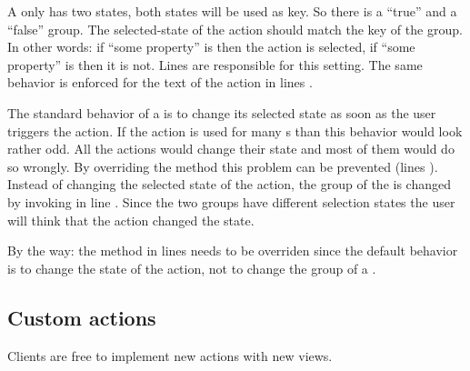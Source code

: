 A  only has two states, both states will be used as key. So there is a ``true'' and a ``false'' group. The selected-state of the action should match the key of the group. In other words: if ``some property'' is  then the action is selected, if ``some property'' is  then it is not. Lines  are responsible for this setting. The same behavior is enforced for the text of the action in lines .


The standard behavior of a  is to change its selected state as soon as the user triggers the action. If the action is used for many s than this behavior would look rather odd. All the actions would change their state and most of them would do so wrongly. By overriding the method  this problem can be prevented (lines ). Instead of changing the selected state of the action, the group of the  is changed by invoking  in line . Since the two groups have different selection states the user will think that the action changed the state.

By the way: the method  in lines  needs to be overriden since the default behavior is to change the state of the action, not to change the group of a .




\subsection{Custom actions}
Clients are free to implement new actions with new views.


